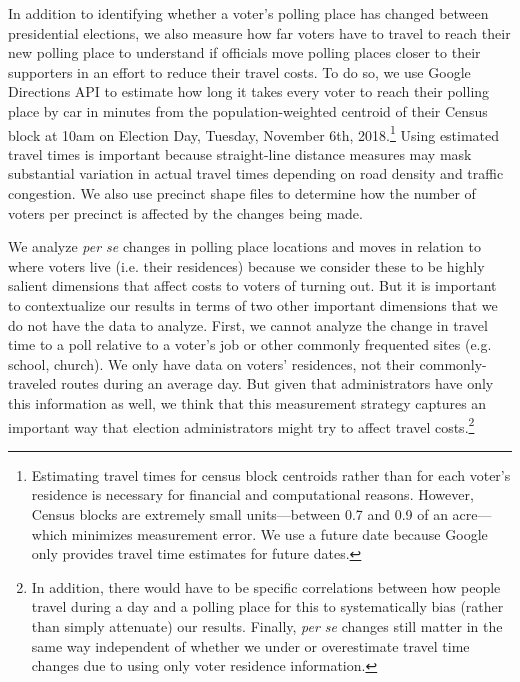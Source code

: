 \documentclass[12pt]{article}
\begin{document}
In addition to identifying whether a voter's polling place has changed between presidential elections, we also measure how far voters have to travel to reach their new polling place to understand if officials move polling places closer to their supporters in an effort to reduce their travel costs. To do so, we use Google Directions API to estimate how long it takes every voter to reach their polling place by car in minutes from the population-weighted centroid of their Census block at 10am on Election Day, Tuesday, November 6th, 2018.\footnote{Estimating travel times for census block centroids rather than for each voter's residence is necessary for financial and computational reasons.  However, Census blocks are extremely small units---between 0.7 and 0.9 of an acre---which minimizes measurement error.  We use a future date because Google only provides travel time estimates for future dates.}  Using estimated travel times is important because straight-line distance measures may mask substantial variation in actual travel times depending on road density and traffic congestion. We also use precinct shape files to determine how the number of voters per precinct is affected by the changes being made.

We analyze \emph{per se} changes in polling place locations and moves in relation to where voters live (i.e. their residences) because we consider these to be highly salient dimensions that affect costs to voters of turning out.  But it is important to contextualize our results in terms of two other important dimensions that we do not have the data to analyze.  First, we cannot analyze the change in travel time to a poll relative to a voter's job or other commonly frequented sites (e.g. school, church).  We only have data on voters' residences, not their commonly-traveled routes during an average day.  But given that administrators have only this information as well, we think that this measurement strategy captures an important way that election administrators might try to affect travel costs.\footnote{In addition, there would have to be specific correlations between how people travel during a day and a polling place for this to systematically bias (rather than simply attenuate) our results.  Finally, \emph{per se} changes still matter in the same way independent of whether we under or overestimate travel time changes due to using only voter residence information.}
\end{document}
